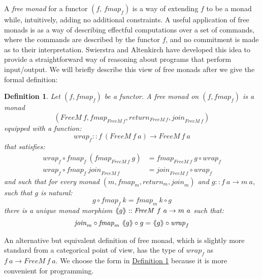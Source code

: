 \documentclass{jfp1}
\newcommand{\fmext}[1]{\langle\kern-0.25em\langle #1 \rangle\kern-0.25em\rangle}
\newtheorem{definition}{Definition}
\newcommand{\defref}[1]{\hyperref[#1]{Definition \ref*{#1}}}
\begin{document}
A \emph{free monad} for a functor $(f,\, \mathit{fmap}_f)$ is a way of
extending $f$ to be a monad while, intuitively, adding no additional
constraints. A useful application of free monads is as a way of
describing effectful computations over a set of commands, where the
commands are described by the functor $f$, and no commitment is made
as to their interpretation. Swierstra and Altenkirch
\cite{swierstra07beauty} have developed this idea to provide a
straightforward way of reasoning about programs that perform
input/output. We will briefly describe this view of free monads after
we give the formal definition:

\begin{definition}\label{defn:freemonad}
  Let $(f, \mathit{fmap}_f)$ be a functor. A \emph{free monad} on
  $(f,\mathit{fmap}_f)$ is a monad
  \begin{displaymath}
    (\mathit{FreeM}~f, \mathit{fmap}_{\mathit{FreeM}~f}, \mathit{return}_{\mathit{FreeM}~f}, \mathit{join}_{\mathit{FreeM}~f})
  \end{displaymath}
  equipped with a function:
  \begin{displaymath}
    \mathit{wrap}_f :: f~(\mathit{FreeM}~f~a) \to \mathit{FreeM}~f~a
  \end{displaymath}
  that satisfies:
  \begin{align}
    \label{eq:wrap-natural}
    \mathit{wrap}_f \circ \mathit{fmap}_f~(\mathit{fmap}_{\mathit{FreeM}~f}~g) &= \mathit{fmap}_{\mathit{FreeM}~f}~g \circ \mathit{wrap}_f \\
    \label{eq:wrap-join}
    \mathit{wrap}_f \circ \mathit{fmap}_f~\mathit{join}_{\mathit{FreeM}~f} &= \mathit{join}_{\mathit{FreeM}~f} \circ \mathit{wrap}_f
  \end{align}
  and such that for every monad $(m, \mathit{fmap}_m,
  \mathit{return_m}, \mathit{join}_m)$ and $g :: f~a \to m~a$, such
  that $g$ is natural:
  \begin{displaymath}
    g \circ \mathit{fmap}_f~k = \mathit{fmap}_m~k \circ g
  \end{displaymath}
  there is a unique monad morphism $\fmext{g} :: \mathit{FreeM}~f~a
  \to m~a$ such that:
  \begin{displaymath}
    \mathit{join}_m \circ \mathit{fmap}_m~\fmext{g} \circ g = \fmext{g} \circ \mathit{wrap}_f
  \end{displaymath}
\end{definition}

An alternative but equivalent definition of free monad, which is
slightly more standard from a categorical point of view, has the type
of $\mathit{wrap}_f$ as $f~a \to \mathit{FreeM}~f~a$. We choose the
form in \defref{defn:freemonad} because it is more convenient for
programming.
\end{document}
